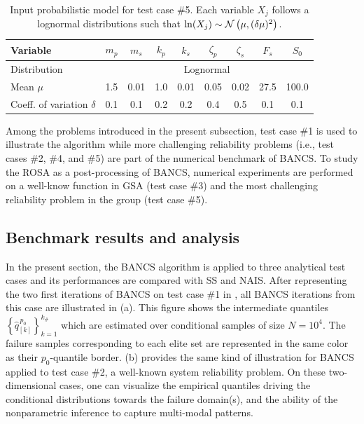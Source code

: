 \begin{table}[h]
\centering
\begin{tabular}{ lcccccccc }
    \hline
    Variable                     & $m_p$ & $m_s$ & $k_p$ & $k_s$ & $\zeta_p$ & $\zeta_s$ & $F_s$ & $S_0$ \\
    \hline          
    Distribution                 &  \multicolumn{8}{c}{Lognormal} \\ 
    Mean $\mu$                   & 1.5 & 0.01 & 1.0 & 0.01 & 0.05 & 0.02 & 27.5 & 100.0\\ 
    Coeff. of variation $\delta$ & 0.1 & 0.1 & 0.2 & 0.2 & 0.4 & 0.5 & 0.1 & 0.1\\
    \hline
\end{tabular}
\caption{Input probabilistic model for test case \#5. Each variable $X_j$ follows a lognormal distributions such that $\mathrm{ln}(X_j)\sim \mathcal{N}\left(\mu, (\delta \mu)^2 \right)$.}
\label{tab:oscillator}
\end{table}

Among the problems introduced in the present subsection, test case \#1 is used to illustrate the algorithm while more challenging reliability problems (i.e., test cases \#2, \#4, and \#5) are part of the numerical benchmark of BANCS. 
To study the ROSA as a post-processing of BANCS, numerical experiments are performed on a well-know function in GSA (test case \#3) and the most challenging reliability problem in the group (test case \#5). 

\subsection{Benchmark results and analysis}

In the present section, the BANCS algorithm is applied to three analytical test cases and its performances are compared with SS and NAIS. 
After representing the two first iterations of BANCS on test case \#1 in , all BANCS iterations from this case are illustrated in  (a). 
This figure shows the intermediate quantiles $\left\{\widehat{q}_{[k]}^{\, p_0}\right\}_{k=1}^{k_\#}$ which are estimated over conditional samples of size $N=10^4$. 
The failure samples corresponding to each elite set are represented in the same color as their $p_0$-quantile border. 
 (b) provides the same kind of illustration for BANCS applied to test case \#2, a well-known system reliability problem. 
On these two-dimensional cases, one can visualize the empirical quantiles driving the conditional distributions towards the failure domain(s), and the ability of the nonparametric inference to capture multi-modal patterns.  

